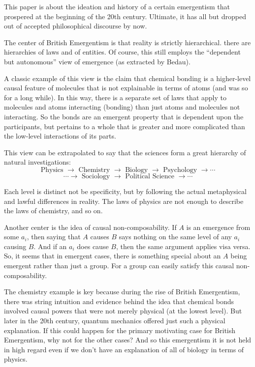 \documentclass{article}
\newcommand{\tx}[1]{\text{#1}}
\begin{document}
This paper is about the ideation and history of a certain emergentism that prospered at the beginning of the 20th century. Ultimate, it has all but dropped out of accepted philosophical discourse by now.

The center of British Emergentism is that reality is strictly hierarchical. there are hierarchies of laws and of entities. Of course, this still employs the ``dependent but autonomous'' view of emergence (as extracted by Bedau).

A classic example of this view is the claim that chemical bonding is a higher-level causal feature of molecules that is not explainable in terms of atoms (and was so for a long while). In this way, there is a separate set of laws that apply to molecules and atoms interacting (bonding) than just atoms and molecules not interacting. So the bonds are an emergent property that is dependent upon the participants, but pertains to a whole that is greater and more complicated than the low-level interactions of its parts.

This view can be extrapolated to say that the sciences form a great hierarchy of natural investigations:
\[
    \tx{Physics } \rightarrow
    \tx{ Chemistry } \rightarrow
    \tx{ Biology } \rightarrow
    \tx{ Psychology } \rightarrow \cdots \] \[ \cdots \rightarrow
    \tx{ Sociology } \rightarrow
    \tx{ Political Science } \rightarrow \cdots
\]

Each level is distinct not be specificity, but by following the actual metaphysical and lawful differences in reality. The laws of physics are not enough to describe the laws of chemistry, and so on.

Another center is the idea of causal non-composability. If $A$ is an emergence from some $a_i$, then saying that $A$ causes $B$ says nothing on the same level of any $a_i$ causing $B$. And if an $a_i$ does cause $B$, then the same argument applies visa versa. So, it seems that in emergent cases, there is something special about an $A$ being emergent rather than just a group. For a group can easily satisfy this causal non-composability.


The chemistry example is key because during the rise of British Emergentism, there was string intuition and evidence behind the idea that chemical bonds involved causal powers that were not merely physical (at the lowest level). But later in the 20th century, quantum mechanics offered just such a physical explanation. If this could happen for the primary motivating case for British Emergentism, why not for the other cases? And so this emergentism it is not held in high regard even if we don't have an explanation of all of biology in terms of physics.
\end{document}
